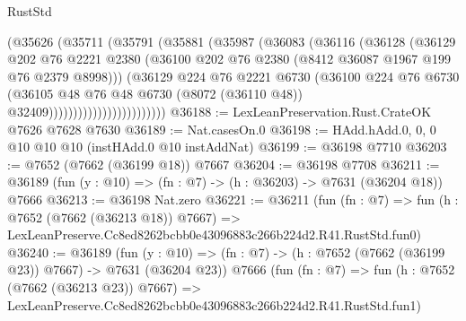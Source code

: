 \begin{lexlean}{RustStd}
\begin{coremodule}
                              (@35626
                                (@35711
                                  (@35791
                                    (@35881
                                      (@35987
                                        (@36083
                                          (@36116
                                            (@36128
                                              (@36129
                                                @202
                                                @76
                                                @2221
                                                @2380
                                                (@36100
                                                  @202
                                                  @76
                                                  @2380
                                                  (@8412 @36087 @1967 @199 @76 @2379 @8998)))
                                              (@36129
                                                @224
                                                @76
                                                @2221
                                                @6730
                                                (@36100
                                                  @224
                                                  @76
                                                  @6730
                                                  (@36105
                                                    @48
                                                    @76
                                                    @48
                                                    @6730
                                                    (@8072 (@36110 @48))
                                                    @32409))))))))))))))))))))))))
@36188 := LexLeanPreservation.Rust.CrateOK @7626 @7628 @7630
@36189 := Nat.casesOn.{0}
@36198 := HAdd.hAdd.{0, 0, 0} @10 @10 @10 (instHAdd.{0} @10 instAddNat)
@36199 := @36198 @7710
@36203 := @7652 (@7662 (@36199 @18)) @7667
@36204 := @36198 @7708
@36211 := @36189 (fun (y : @10) => (fn : @7) -> (h : @36203) -> @7631 (@36204 @18)) @7666
@36213 := @36198 Nat.zero
@36221 := @36211
    (fun (fn : @7) =>
    fun (h : @7652 (@7662 (@36213 @18)) @7667) =>
    LexLeanPreserve.Cc8ed8262bcbb0e43096883c266b224d2.R41.RustStd.fun0)
@36240 := @36189
    (fun (y : @10) => (fn : @7) -> (h : @7652 (@7662 (@36199 @23)) @7667) -> @7631 (@36204 @23))
    @7666
    (fun (fn : @7) =>
    fun (h : @7652 (@7662 (@36213 @23)) @7667) =>
    LexLeanPreserve.Cc8ed8262bcbb0e43096883c266b224d2.R41.RustStd.fun1)

\end{coremodule}
\end{lexlean}
